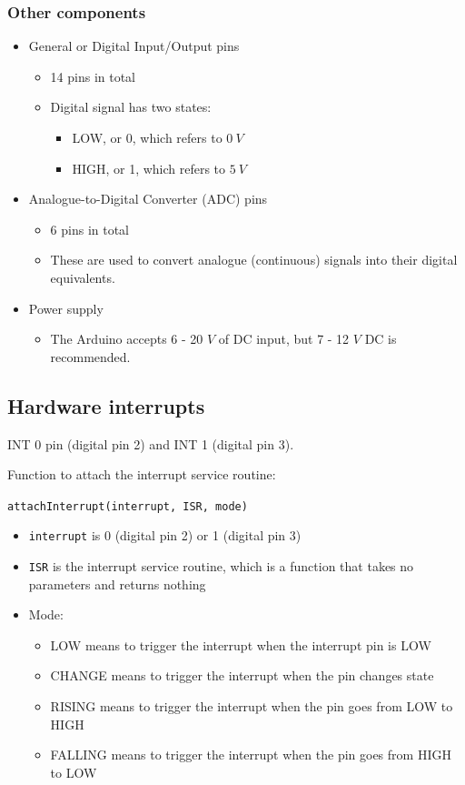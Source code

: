 \documentclass[11pt]{article}
\begin{document}
\subsubsection{Other components}
\label{sec:org3d6db6b}
\begin{itemize}
\item General or Digital Input/Output pins
\begin{itemize}
\item 14 pins in total
\item Digital signal has two states:
\begin{itemize}
\item LOW, or 0, which refers to \(\qty{0}{V}\)
\item HIGH, or 1, which refers to \(\qty{5}{V}\)
\end{itemize}
\end{itemize}
\item Analogue-to-Digital Converter (ADC) pins
\begin{itemize}
\item 6 pins in total
\item These are used to convert analogue (continuous) signals into their digital equivalents.
\end{itemize}
\item Power supply
\begin{itemize}
\item The Arduino accepts 6 - 20 \(\unit{V}\) of DC input, but 7 - 12 \(\unit{V}\) DC is recommended.
\end{itemize}
\end{itemize}

 \newpage
\subsection{Hardware interrupts}
\label{sec:orgc0fbabf}
INT 0 pin (digital pin 2) and INT 1 (digital pin 3).


Function to attach the interrupt service routine:

\texttt{attachInterrupt(interrupt, ISR, mode)}
\begin{itemize}
\item \texttt{interrupt} is 0 (digital pin 2) or 1 (digital pin 3)
\item \texttt{ISR} is the interrupt service routine, which is a function that takes no parameters and returns nothing
\item Mode:
\begin{itemize}
\item LOW means to trigger the interrupt when the interrupt pin is LOW
\item CHANGE means to trigger the interrupt when the pin changes state
\item RISING means to trigger the interrupt when the pin goes from LOW to HIGH
\item FALLING means to trigger the interrupt when the pin goes from HIGH to LOW
\end{itemize}
\end{itemize}
\end{document}
